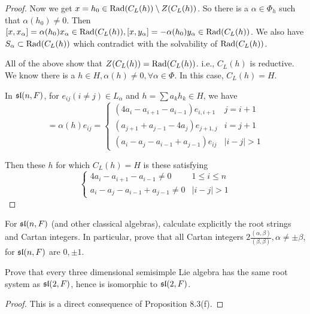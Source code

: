 \begin{proof}
  Now we get $x = h_0 \in \Rad(C_L(h))\setminus Z(C_L(h))$. So there is a $\alpha\in\Phi_h$ such that $\alpha(h_0) \neq 0$. Then $[x,x_{\alpha}] = \alpha(h_0)x_{\alpha} \in\Rad(C_L(h)), [x, y_{\alpha}] = -\alpha(h_0)y_{\alpha}\in \Rad(C_L(h))$. We also have $S_{\alpha}\subset \Rad(C_L(h))$ which contradict with the solvability of $\Rad(C_L(h))$.

  All of the above show that $Z(C_L(h)) = \Rad(C_L(h))$. i.e., $C_L(h)$ is reductive. We know there is a $h \in H, \alpha(h) \neq 0, \forall\alpha\in\Phi$. In this case, $C_L(h) = H$.

  In $\sl(n,F)$, for $e_{ij}(i\neq j)\in L_{\alpha}$ and $h=\sum a_kh_k\in H$, we have
  \begin{equation*}
    [h,e_{ij}] = \alpha(h)e_{ij} =
    \begin{cases}
      (4a_i-a_{i+1}-a_{i-1})e_{i,i+1} & j=i+1\\
      (a_{j+1}+a_{j-1}-4a_j)e_{j+1,j} & i=j+1 \\
      (a_i-a_j-a_{i-1}+a_{j-1})e_{ij} & |i-j|>1
    \end{cases}
  \end{equation*}

  Then these $h$ for which $C_L(h)=H$ is these satisfying
  \begin{equation*}
    \begin{cases}
      4a_i-a_{i+1}-a_{i-1}\neq0 & 1\leqslant i\leqslant n\\
      a_i-a_j-a_{i-1}+a_{j-1}\neq 0 & |i-j|>1
    \end{cases}
  \end{equation*}
\end{proof}

\begin{ex}
  For $\sl(n,F)$ (and other classical algebras), calculate explicitly the root strings and Cartan integers. In particular, prove that all Cartan integers $2\frac{(\alpha,\beta)}{(\beta,\beta)},\alpha\neq\pm\beta$, for $\sl(n,F)$ are $0,\pm1$.
\end{ex}

\begin{ex}
  Prove that every three dimensional semisimple Lie algebra has the same root system as $\sl(2,F)$, hence is isomorphic to $\sl(2,F)$.
\end{ex}
\begin{proof}
  This is a direct consequence of Proposition 8.3(f).
\end{proof}

